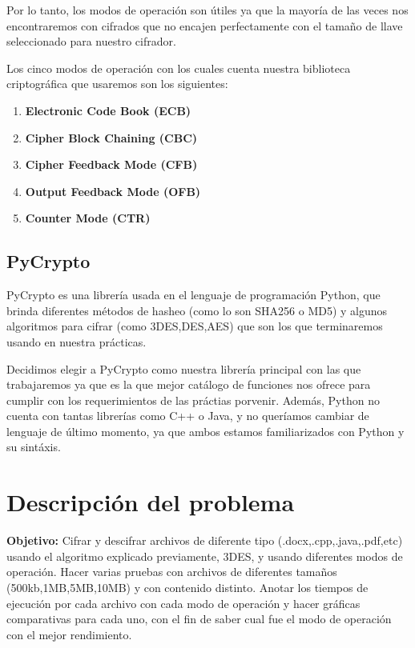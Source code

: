 \documentclass[10pt]{article}
\begin{document}
      Por lo tanto, los modos de operación son útiles ya que la mayoría de las veces nos encontraremos con cifrados que no encajen perfectamente con el tamaño de llave seleccionado para nuestro cifrador.

      Los cinco modos de operación con los cuales cuenta nuestra biblioteca criptográfica que usaremos son los siguientes:

      \begin{enumerate}
         \item \textbf{Electronic Code Book (ECB)}
         \item \textbf{Cipher Block Chaining (CBC)}
         \item \textbf{Cipher Feedback Mode (CFB)}
         \item \textbf{Output Feedback Mode (OFB)}
         \item \textbf{Counter Mode (CTR)}
      \end{enumerate}

   \subsection{PyCrypto}
      PyCrypto es una librería usada en el lenguaje de programación Python, que brinda diferentes métodos de hasheo (como lo son SHA256 o MD5) y algunos algoritmos para cifrar (como 3DES,DES,AES) que son los que terminaremos usando en nuestra prácticas. 

      Decidimos elegir a PyCrypto como nuestra librería principal con las que trabajaremos ya que es la que mejor catálogo de funciones nos ofrece para cumplir con los requerimientos de las práctias porvenir. Además, Python no cuenta con tantas librerías como C++ o Java, y no queríamos cambiar de lenguaje de último momento, ya que ambos estamos familiarizados con Python y su sintáxis.

\section{Descripción del problema}
   \textbf{Objetivo:} Cifrar y descifrar archivos de diferente tipo (.docx,.cpp,.java,.pdf,etc) usando el algoritmo explicado previamente, 3DES, y usando diferentes modos de operación. Hacer varias pruebas con archivos de diferentes tamaños (500kb,1MB,5MB,10MB) y con contenido distinto. Anotar los tiempos de ejecución por cada archivo con cada modo de operación y hacer gráficas comparativas para cada uno, con el fin de saber cual fue el modo de operación con el mejor rendimiento.
\end{document}
